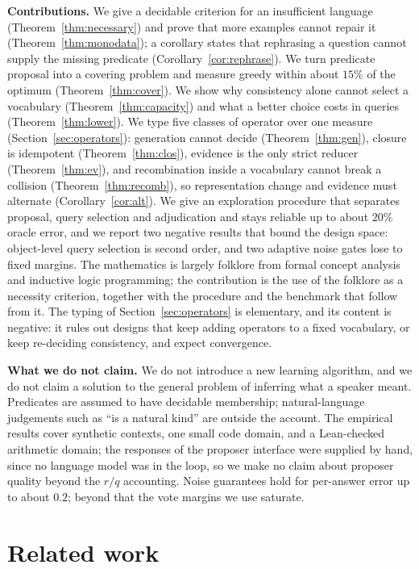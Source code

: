 \documentclass[11pt]{article}
\begin{document}
\textbf{Contributions.} We give a decidable criterion for an insufficient language
(Theorem~\ref{thm:necessary}) and prove that more examples cannot repair it
(Theorem~\ref{thm:monodata}); a corollary states that rephrasing a question cannot supply the missing
predicate (Corollary~\ref{cor:rephrase}). We turn predicate proposal into a covering problem and measure
greedy within about $15\%$ of the optimum (Theorem~\ref{thm:cover}). We show why consistency alone
cannot select a vocabulary (Theorem~\ref{thm:capacity}) and what a better choice costs in queries
(Theorem~\ref{thm:lower}). We type five classes of operator over one measure (Section~\ref{sec:operators}):
generation cannot decide (Theorem~\ref{thm:gen}), closure is idempotent (Theorem~\ref{thm:clos}),
evidence is the only strict reducer (Theorem~\ref{thm:ev}), and recombination inside a vocabulary cannot
break a collision (Theorem~\ref{thm:recomb}), so representation change and evidence must alternate
(Corollary~\ref{cor:alt}). We give an exploration procedure that separates proposal, query selection and
adjudication and stays reliable up to about $20\%$ oracle error, and we report two negative results that
bound the design space: object-level query selection is second order, and two adaptive noise gates lose
to fixed margins.
The mathematics is largely folklore from formal concept analysis and inductive logic
programming; the contribution is the use of the folklore as a necessity criterion, together
with the procedure and the benchmark that follow from it. The typing of
Section~\ref{sec:operators} is elementary, and its content is negative: it rules out designs that keep
adding operators to a fixed vocabulary, or keep re-deciding consistency, and expect convergence.

\textbf{What we do not claim.} We do not introduce a new learning algorithm, and we do not claim a
solution to the general problem of inferring what a speaker meant. Predicates are assumed to have
decidable membership; natural-language judgements such as ``is a natural kind'' are outside the
account. The empirical results cover synthetic contexts, one small code domain, and a Lean-checked
arithmetic domain; the responses of the proposer interface were supplied by hand, since no language
model was in the loop, so we make no claim about proposer quality beyond the $r/q$ accounting.
Noise guarantees hold for per-answer error up to about $0.2$; beyond that the vote margins we use
saturate.

\section{Related work}
\end{document}
